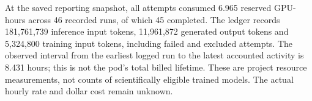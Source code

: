 At the saved reporting snapshot, all attempts consumed 6.965 reserved GPU-hours across 46 recorded runs, of which 45 completed. The ledger records 181,761,739 inference input tokens, 11,961,872 generated output tokens and 5,324,800 training input tokens, including failed and excluded attempts. The observed interval from the earliest logged run to the latest accounted activity is 8.431 hours; this is not the pod's total billed lifetime. These are project resource measurements, not counts of scientifically eligible trained models. The actual hourly rate and dollar cost remain unknown.
